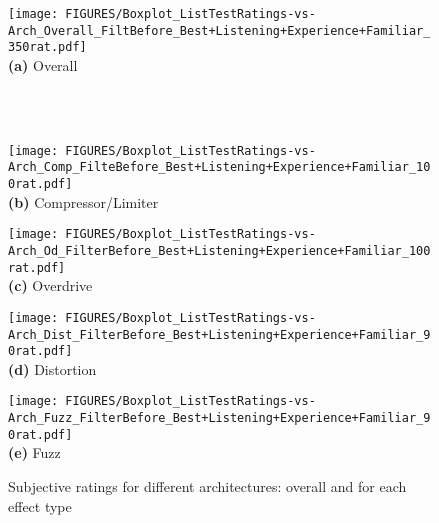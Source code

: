 \begin{figure*}[t]
    \begin{minipage}{1\textwidth}
        \centering
        \texttt{[image: FIGURES/Boxplot\_ListTestRatings-vs-Arch\_Overall\_FiltBefore\_Best+Listening+Experience+Familiar\_350rat.pdf]}
        \\\textbf{(a)} Overall
    \end{minipage}\\\\
    
    \begin{minipage}{.255\textwidth}
        \centering
        \texttt{[image: FIGURES/Boxplot\_ListTestRatings-vs-Arch\_Comp\_FilteBefore\_Best+Listening+Experience+Familiar\_100rat.pdf]}
        \\\textbf{(b)} Compressor/Limiter
    \end{minipage}
    \begin{minipage}{.23\textwidth}
        \centering
        \texttt{[image: FIGURES/Boxplot\_ListTestRatings-vs-Arch\_Od\_FilterBefore\_Best+Listening+Experience+Familiar\_100rat.pdf]}
        \\\textbf{(c)} Overdrive
    \end{minipage}
    \begin{minipage}{.23\textwidth}
        \centering
        \texttt{[image: FIGURES/Boxplot\_ListTestRatings-vs-Arch\_Dist\_FilterBefore\_Best+Listening+Experience+Familiar\_90rat.pdf]}
        \\\textbf{(d)} Distortion
    \end{minipage}
    \begin{minipage}{.23\textwidth}
        \centering
        \texttt{[image: FIGURES/Boxplot\_ListTestRatings-vs-Arch\_Fuzz\_FilterBefore\_Best+Listening+Experience+Familiar\_90rat.pdf]}
        \\\textbf{(e)} Fuzz
    \end{minipage}
    \caption{Subjective ratings for different architectures: overall and for each effect type}
    \label{fig:list_test}
\end{figure*}

